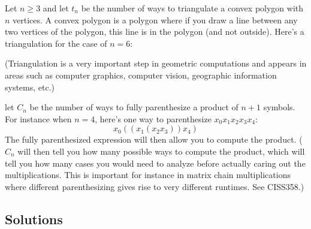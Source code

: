 \begin{ex}
  Let $n \geq 3$ and let $t_n$ be the number of ways to triangulate a convex
  polygon
  with $n$ vertices.
  A convex polygon is a polygon where if you draw a line between any two
  vertices of the polygon, this line is in the polygon (and not outside).
  Here's a triangulation for the case of $n = 6$:
  
  (Triangulation is a very important step in geometric computations
  and appears in areas
  such as computer graphics, computer vision, geographic information
  systems, etc.)
\end{ex}



\begin{ex}
  let $C_n$ be the number of ways to fully parenthesize a product of
  $n + 1$ symbols.
  For instance when $n = 4$,
  here's one way to parenthesize $x_0 x_1 x_2 x_3 x_4$:
  \[
    x_0 ((x_1 (x_2 x_3)) x_4)
  \]
  The fully parenthesized expression will then allow you to compute
  the product.
  ($C_n$ will then tell you how many possible ways to compute the
  product, which will tell you how many cases you would need to analyze
  before actually caring out the multiplications.
  This is important for instance in matrix chain multiplications
  where different parenthesizing gives rise to very different runtimes.
  See CISS358.)
\end{ex}

\newpage
\subsection*{Solutions}

